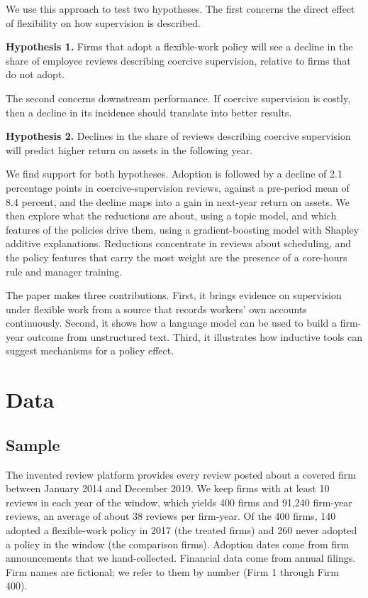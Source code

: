 \documentclass[12pt]{article}
\begin{document}
We use this approach to test two hypotheses. The first concerns the direct effect of flexibility on how supervision is described.

\medskip\noindent\textbf{Hypothesis 1.} Firms that adopt a flexible-work policy will see a decline in the share of employee reviews describing coercive supervision, relative to firms that do not adopt.

\medskip\noindent The second concerns downstream performance. If coercive supervision is costly, then a decline in its incidence should translate into better results.

\medskip\noindent\textbf{Hypothesis 2.} Declines in the share of reviews describing coercive supervision will predict higher return on assets in the following year.

\medskip\noindent We find support for both hypotheses. Adoption is followed by a decline of 2.1 percentage points in coercive-supervision reviews, against a pre-period mean of 8.4 percent, and the decline maps into a gain in next-year return on assets. We then explore what the reductions are about, using a topic model, and which features of the policies drive them, using a gradient-boosting model with Shapley additive explanations. Reductions concentrate in reviews about scheduling, and the policy features that carry the most weight are the presence of a core-hours rule and manager training.

The paper makes three contributions. First, it brings evidence on supervision under flexible work from a source that records workers' own accounts continuously. Second, it shows how a language model can be used to build a firm-year outcome from unstructured text. Third, it illustrates how inductive tools can suggest mechanisms for a policy effect.

\section{Data}
\subsection{Sample}
The invented review platform provides every review posted about a covered firm between January 2014 and December 2019. We keep firms with at least 10 reviews in each year of the window, which yields 400 firms and 91,240 firm-year reviews, an average of about 38 reviews per firm-year. Of the 400 firms, 140 adopted a flexible-work policy in 2017 (the treated firms) and 260 never adopted a policy in the window (the comparison firms). Adoption dates come from firm announcements that we hand-collected. Financial data come from annual filings. Firm names are fictional; we refer to them by number (Firm 1 through Firm 400).
\end{document}
